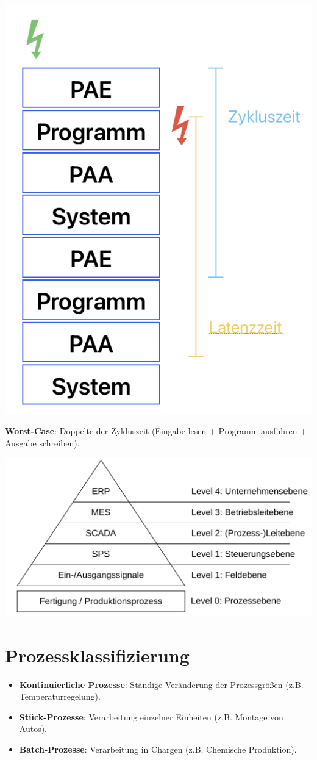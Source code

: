 \documentclass[10pt, a3paper, landscape]{article}
\newcommand{\algo}[1]{\textbf{\textcolor{blue!60!black}{#1}}}
\newcommand{\datastruct}[1]{\textbf{\textcolor{red!60!black}{#1}}}
\begin{document}
\begin{multicols*}{4}
\begin{itemize}
\begin{center}
    \includegraphics[width=0.5\linewidth]{assets/ATT.png}
\end{center}

\algo{Worst-Case}: Doppelte der Zykluszeit (Eingabe lesen + Programm ausführen + Ausgabe schreiben).

\begin{center}
    \includegraphics[width=0.8\linewidth]{assets/ATP.png}
\end{center}

\section{Prozessklassifizierung}

\begin{itemize}
    \item \datastruct{Kontinuierliche Prozesse}: Ständige Veränderung der Prozessgrößen (z.B. Temperaturregelung).
    \item \datastruct{Stück-Prozesse}: Verarbeitung einzelner Einheiten (z.B. Montage von Autos).
    \item \datastruct{Batch-Prozesse}: Verarbeitung in Chargen (z.B. Chemische Produktion).
\end{itemize}


\end{itemize}
\end{multicols*}
\end{document}
